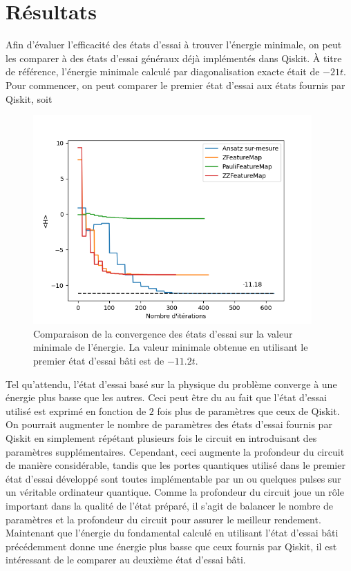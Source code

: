 \documentclass{subfiles}[../main.tex]
\begin{document}
\section{Résultats}
    Afin d'évaluer l'efficacité des états d'essai à trouver l'énergie minimale,
    on peut les comparer à des états d'essai généraux déjà implémentés dans
    Qiskit. À titre de référence, l'énergie minimale calculé par diagonalisation
    exacte était de $-21t$. Pour commencer, on peut comparer le premier état
    d'essai aux états fournis par Qiskit, soit

\begin{figure}[H]
    \begin{center}
        \includegraphics[width=0.95\textwidth]{../figs/convergence.png}
    \end{center}
    \caption{Comparaison de la convergence des états d'essai sur la valeur
    minimale de l'énergie. La valeur minimale obtenue en utilisant le premier
    état d'essai bâti est de $-11.2t$.}
    \label{fig:}
\end{figure}
    Tel qu'attendu, l'état d'essai basé sur la physique du problème converge
    à une énergie plus basse que les autres. Ceci peut être du au fait que
    l'état d'essai utilisé est exprimé en fonction de $2$ fois plus de
    paramètres que ceux de Qiskit. On pourrait augmenter le nombre de paramètres
    des états d'essai fournis par Qiskit en simplement répétant plusieurs fois
    le circuit en introduisant des paramètres supplémentaires. Cependant, ceci
    augmente la profondeur du circuit de manière considérable, tandis que les
    portes quantiques utilisé dans le premier état d'essai développé sont toutes
    implémentable par un ou quelques pulses sur un véritable ordinateur quantique. Comme
    la profondeur du circuit joue un rôle important dans la qualité de l'état
    préparé, il s'agit de balancer le nombre de paramètres et la profondeur
    du circuit pour assurer le meilleur rendement.\\
    Maintenant que l'énergie du fondamental calculé en utilisant l'état d'essai bâti
    précédemment donne une énergie plus basse que ceux fournis par Qiskit, il est
    intéressant de le comparer au deuxième état d'essai bâti.
\end{document}
